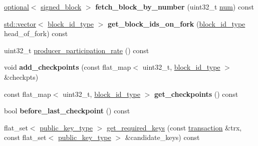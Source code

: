 \begin{DoxyCompactItemize}
\item 
\mbox{\label{classaacio_1_1chain_1_1chain__controller_ab7e2a521a47dc473b12ee5bd435dc493}} 
\mbox{\hyperlink{classfc_1_1optional}{optional}}$<$ \mbox{\hyperlink{structaacio_1_1chain_1_1signed__block}{signed\+\_\+block}} $>$ {\bfseries fetch\+\_\+block\+\_\+by\+\_\+number} (uint32\+\_\+t \mbox{\hyperlink{structnum}{num}}) const
\item 
\mbox{\label{classaacio_1_1chain_1_1chain__controller_a08b207d7aaa8476296f2b339b4e407c9}} 
\mbox{\hyperlink{classstd_1_1vector}{std\+::vector}}$<$ \mbox{\hyperlink{classfc_1_1sha256}{block\+\_\+id\+\_\+type}} $>$ {\bfseries get\+\_\+block\+\_\+ids\+\_\+on\+\_\+fork} (\mbox{\hyperlink{classfc_1_1sha256}{block\+\_\+id\+\_\+type}} head\+\_\+of\+\_\+fork) const
\item 
uint32\+\_\+t \mbox{\hyperlink{classaacio_1_1chain_1_1chain__controller_a524ad0811937cfc85d2492875c76f1fa}{producer\+\_\+participation\+\_\+rate}} () const
\item 
\mbox{\label{classaacio_1_1chain_1_1chain__controller_aad6cc0d9e90ff634239350faabb90a3a}} 
void {\bfseries add\+\_\+checkpoints} (const flat\+\_\+map$<$ uint32\+\_\+t, \mbox{\hyperlink{classfc_1_1sha256}{block\+\_\+id\+\_\+type}} $>$ \&checkpts)
\item 
\mbox{\label{classaacio_1_1chain_1_1chain__controller_aa2745059b10c8cf293ae8a6562d7020b}} 
const flat\+\_\+map$<$ uint32\+\_\+t, \mbox{\hyperlink{classfc_1_1sha256}{block\+\_\+id\+\_\+type}} $>$ {\bfseries get\+\_\+checkpoints} () const
\item 
\mbox{\label{classaacio_1_1chain_1_1chain__controller_a06b1ee649a875c37f34e2fb181857754}} 
bool {\bfseries before\+\_\+last\+\_\+checkpoint} () const
\item 
flat\+\_\+set$<$ \mbox{\hyperlink{classfc_1_1crypto_1_1public__key}{public\+\_\+key\+\_\+type}} $>$ \mbox{\hyperlink{classaacio_1_1chain_1_1chain__controller_af2f9f9c166af2e8d8dc8811d242e872a}{get\+\_\+required\+\_\+keys}} (const \mbox{\hyperlink{structaacio_1_1chain_1_1transaction}{transaction}} \&trx, const flat\+\_\+set$<$ \mbox{\hyperlink{classfc_1_1crypto_1_1public__key}{public\+\_\+key\+\_\+type}} $>$ \&candidate\+\_\+keys) const

\end{DoxyCompactItemize}
